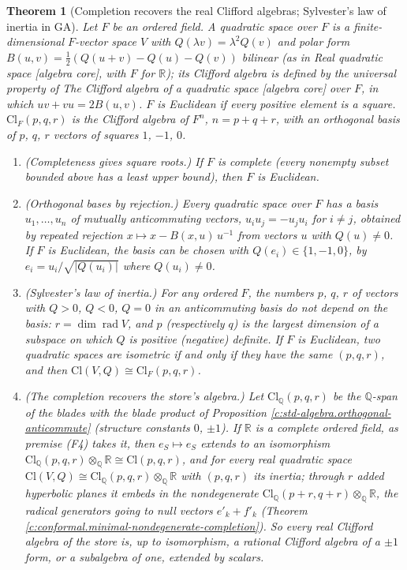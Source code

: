 \documentclass[11pt]{article}
\newtheorem{theorem}{Theorem}[section]
\theoremstyle{definition}
\theoremstyle{plain}
\newcommand{\changedmark}[2]{\marginpar{\raggedright\scriptsize\color{#1}#2}}
\providecommand{\Cl}{}\renewcommand{\Cl}{\mathrm{Cl}}
\providecommand{\Q}{}\renewcommand{\Q}{\mathbb{Q}}
\providecommand{\R}{}\renewcommand{\R}{\mathbb{R}}
\begin{document}
\begin{theorem}[Completion recovers the real Clifford algebras; Sylvester's law of inertia in GA]\label{c:synthesis.completion-recovers-the-real-clifford-algebras}
\changedmark{BurntOrange}{changed since the deposit}
Let $F$ be an ordered field. A quadratic space over $F$ is a finite-dimensional $F$-vector space $V$ with $Q(\lambda v) = \lambda^{2}Q(v)$ and polar form $B(u, v) = \tfrac12(Q(u + v) - Q(u) - Q(v))$ bilinear (as in \emph{Real quadratic space} [algebra core], with $F$ for $\R$); its Clifford algebra is defined by the universal property of \emph{The Clifford algebra of a quadratic space} [algebra core] over $F$, in which $uv + vu = 2B(u,v)$. $F$ is \emph{Euclidean} if every positive element is a square. $\Cl_{F}(p,q,r)$ is the Clifford algebra of $F^{n}$, $n = p + q + r$, with an orthogonal basis of $p$, $q$, $r$ vectors of squares $1$, $-1$, $0$.
\begin{enumerate}
\item[(i)] \emph{(Completeness gives square roots.)} If $F$ is complete (every nonempty subset bounded above has a least upper bound), then $F$ is Euclidean.
\item[(ii)] \emph{(Orthogonal bases by rejection.)} Every quadratic space over $F$ has a basis $u_{1}, \dots, u_{n}$ of mutually anticommuting vectors, $u_{i}u_{j} = -u_{j}u_{i}$ for $i \ne j$, obtained by repeated rejection $x \mapsto x - B(x, u)\,u^{-1}$ from vectors $u$ with $Q(u) \ne 0$. If $F$ is Euclidean, the basis can be chosen with $Q(e_{i}) \in \{1, -1, 0\}$, by $e_{i} = u_{i}/\sqrt{|Q(u_{i})|}$ where $Q(u_{i}) \ne 0$.
\item[(iii)] \emph{(Sylvester's law of inertia.)} For any ordered $F$, the numbers $p$, $q$, $r$ of vectors with $Q > 0$, $Q < 0$, $Q = 0$ in an anticommuting basis do not depend on the basis: $r = \dim \operatorname{rad} V$, and $p$ (respectively $q$) is the largest dimension of a subspace on which $Q$ is positive (negative) definite. If $F$ is Euclidean, two quadratic spaces are isometric if and only if they have the same $(p, q, r)$, and then $\Cl(V, Q) \cong \Cl_{F}(p,q,r)$.
\item[(iv)] \emph{(The completion recovers the store's algebra.)} Let $\Cl_{\Q}(p,q,r)$ be the $\Q$-span of the blades with the blade product of Proposition \ref{c:std-algebra.orthogonal-anticommute} (structure constants $0$, $\pm 1$). If $\R$ is a complete ordered field, as premise (F4) takes it, then $e_{S} \mapsto e_{S}$ extends to an isomorphism $\Cl_{\Q}(p,q,r) \otimes_{\Q} \R \cong \Cl(p,q,r)$, and for every real quadratic space $\Cl(V, Q) \cong \Cl_{\Q}(p,q,r) \otimes_{\Q} \R$ with $(p, q, r)$ its inertia; through $r$ added hyperbolic planes it embeds in the nondegenerate $\Cl_{\Q}(p{+}r,q{+}r) \otimes_{\Q} \R$, the radical generators going to null vectors $e'_{k} + f'_{k}$ (Theorem \ref{c:conformal.minimal-nondegenerate-completion}). So every real Clifford algebra of the store is, up to isomorphism, a rational Clifford algebra of a $\pm 1$ form, or a subalgebra of one, extended by scalars.

\end{enumerate}
\end{theorem}
\end{document}
